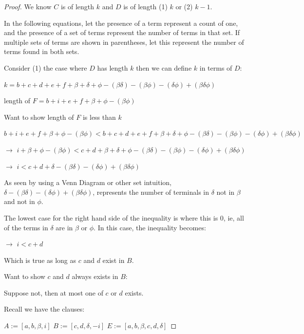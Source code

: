 \documentclass[manuscript]{acmart}
\begin{document}
\begin{proof}
        We know $C$ is of length $k$ and $D$ is of length (1) $k$ or (2) $k-1$.

        In the following equations, let the presence of a term represent a count of one, and the presence of a set of terms represent the number of terms in that set. If multiple sets of terms are shown in parentheses, let this represent the number of terms found in both sets.

        Consider (1) the case where $D$ has length $k$ then we can define $k$ in terms of $D$:
        
        $k = b + c + d + e + f + \beta + \delta + \phi - (\beta \delta) - 
        (\beta \phi) - (\delta \phi) + (\beta \delta \phi)$

        length of $F = b + i + e + f + \beta + \phi - (\beta \phi)$

        Want to show length of $F$ is less than $k$

        $b + i + e + f + \beta + \phi - (\beta \phi) < 
        b + c + d + e + f + \beta + \delta + \phi - (\beta \delta) - 
        (\beta \phi) - (\delta \phi) + (\beta \delta \phi)$

        $\rightarrow$ $i + \beta + \phi - (\beta \phi) < 
        c + d + \beta + \delta + \phi - (\beta \delta) - 
        (\beta \phi) - (\delta \phi) + (\beta \delta \phi)$

        $\rightarrow$ $i < 
        c + d + \delta - (\beta \delta) - (\delta \phi) + (\beta \delta \phi)$

        As seen by using a Venn Diagram or other set intuition, $\delta - 
        (\beta \delta) - (\delta \phi) + (\beta \delta \phi)$, 
        represents the number of terminals in $\delta$ not in $\beta$
        and not in $\phi$.

        The lowest case for the right hand side of the inequality is where 
        this is 0, ie, all of the terms in $\delta$ are in $\beta$ or 
        $\phi$. In this case, the inequality becomes:

        $\rightarrow$ $i < c + d$

        Which is true as long as $c$ and $d$ exist in $B$.

        Want to show $c$ and $d$ always exists in $B$:

        Suppose not, then at most one of $c$ or $d$ exists.

        Recall we have the clauses:

        $A := [a, b, \beta, i]$
        $B := [c, d, \delta, -i]$
        $E := [a, b, \beta, c, d, \delta]$


\end{proof}
\end{document}
